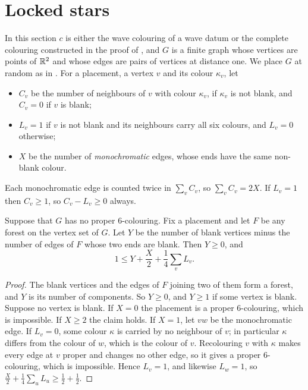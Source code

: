 \documentclass[11pt,colorlinks]{charlie}
\begin{document}
\section{Locked stars}\label{sec:stars}

In this section $c$ is either the wave colouring of a wave datum or the complete colouring constructed in the proof of , and $G$ is a finite graph whose vertices are points of $\mathbb{R}^2$ and whose edges are pairs of vertices at distance one. We place $G$ at random as in . For a placement, a vertex $v$ and its colour $\kappa_v$, let
\begin{itemize}
\item $C_v$ be the number of neighbours of $v$ with colour $\kappa_v$, if $\kappa_v$ is not blank, and $C_v=0$ if $v$ is blank;
\item $L_v=1$ if $v$ is not blank and its neighbours carry all six colours, and $L_v=0$ otherwise;
\item $X$ be the number of \emph{monochromatic} edges, whose ends have the same non-blank colour.
\end{itemize}
Each monochromatic edge is counted twice in $\sum_vC_v$, so $\sum_vC_v=2X$. If $L_v=1$ then $C_v\ge1$, so $C_v-L_v\ge0$ always.

\begin{lemma}\label{lem:onebad}
Suppose that $G$ has no proper $6$-colouring. Fix a placement and let $F$ be any forest on the vertex set of $G$. Let $Y$ be the number of blank vertices minus the number of edges of $F$ whose two ends are blank. Then $Y\ge0$, and
\[
 1\le Y+\frac X2+\frac14\sum_vL_v .
\]
\end{lemma}

\begin{proof}
The blank vertices and the edges of $F$ joining two of them form a forest, and $Y$ is its number of components. So $Y\ge0$, and $Y\ge1$ if some vertex is blank. Suppose no vertex is blank. If $X=0$ the placement is a proper $6$-colouring, which is impossible. If $X\ge2$ the claim holds. If $X=1$, let $vw$ be the monochromatic edge. If $L_v=0$, some colour $\kappa$ is carried by no neighbour of $v$; in particular $\kappa$ differs from the colour of $w$, which is the colour of $v$. Recolouring $v$ with $\kappa$ makes every edge at $v$ proper and changes no other edge, so it gives a proper $6$-colouring, which is impossible. Hence $L_v=1$, and likewise $L_w=1$, so $\frac X2+\frac14\sum_uL_u\ge\frac12+\frac12$.
\end{proof}
\end{document}
